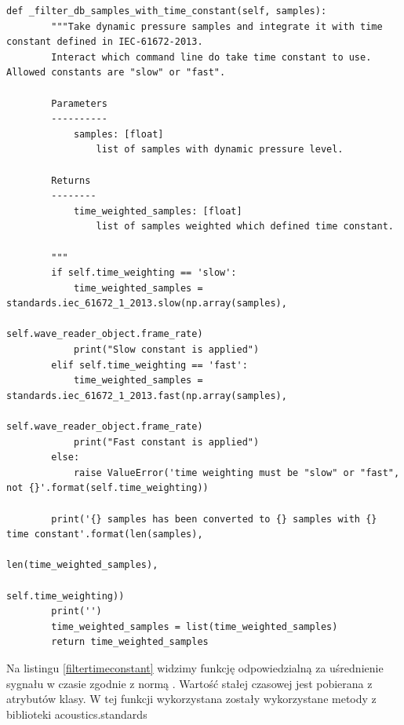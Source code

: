 \documentclass[eng,printmode]{mgr}
\begin{document}
\begin{minipage}{\linewidth}
\begin{lstlisting}[caption={fragment kodu źródłowego pliku SampledBConverter.py, klasa SamplesDbFSConverter, metoda \_filte\_db\_samples\_with\_time\_constant},captionpos=b,label={filtertimeconstant}]
    def _filter_db_samples_with_time_constant(self, samples):
        """Take dynamic pressure samples and integrate it with time constant defined in IEC-61672-2013.
        Interact which command line do take time constant to use. Allowed constants are "slow" or "fast".

        Parameters
        ----------
            samples: [float]
                list of samples with dynamic pressure level.

        Returns
        --------
            time_weighted_samples: [float]
                list of samples weighted which defined time constant.

        """
        if self.time_weighting == 'slow':
            time_weighted_samples = standards.iec_61672_1_2013.slow(np.array(samples),
                                                                    self.wave_reader_object.frame_rate)
            print("Slow constant is applied")
        elif self.time_weighting == 'fast':
            time_weighted_samples = standards.iec_61672_1_2013.fast(np.array(samples),
                                                                    self.wave_reader_object.frame_rate)
            print("Fast constant is applied")
        else:
            raise ValueError('time weighting must be "slow" or "fast", not {}'.format(self.time_weighting))

        print('{} samples has been converted to {} samples with {} time constant'.format(len(samples),
                                                                            len(time_weighted_samples),
                                                                                   self.time_weighting))
        print('')
        time_weighted_samples = list(time_weighted_samples)
        return time_weighted_samples
\end{lstlisting}
\end{minipage}

Na listingu \ref{filtertimeconstant} widzimy funkcję odpowiedzialną za uśrednienie sygnału w czasie zgodnie z normą \cite{IEC-61672-2013}. Wartość stałej czasowej jest pobierana z atrybutów klasy. W tej funkcji wykorzystana zostały wykorzystane metody z biblioteki acoustics.standards \cite{acoustics}
\end{document}

